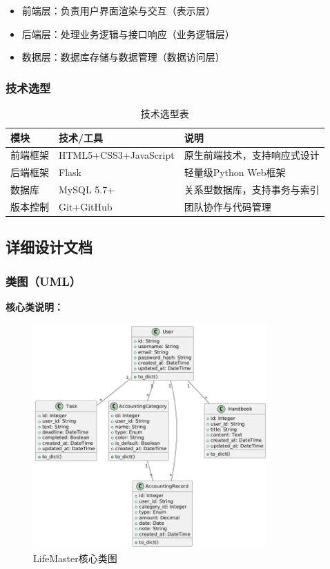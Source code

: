 \documentclass[a4paper]{article}
\begin{document}
\begin{itemize}
    \item 前端层：负责用户界面渲染与交互（表示层）
    \item 后端层：处理业务逻辑与接口响应（业务逻辑层）
    \item 数据层：数据库存储与数据管理（数据访问层）
\end{itemize}

\subsubsection{技术选型}

\begin{table}[H]
\centering
\begin{tabular}{|l|l|l|}
\hline
\textbf{模块} & \textbf{技术/工具} & \textbf{说明} \\
\hline
前端框架 & HTML5+CSS3+JavaScript & 原生前端技术，支持响应式设计 \\
\hline
后端框架 & Flask & 轻量级Python Web框架 \\
\hline
数据库 & MySQL 5.7+ & 关系型数据库，支持事务与索引 \\
\hline
版本控制 & Git+GitHub & 团队协作与代码管理 \\
\hline
\end{tabular}
\caption{技术选型表}
\end{table}

\subsection{详细设计文档}

\subsubsection{类图（UML）}

\textbf{核心类说明：}

\begin{figure}[H]
\centering
\includegraphics[width=0.8\textwidth]{img/class_diagram.png}
\caption{LifeMaster核心类图}
\end{figure}
\end{document}
